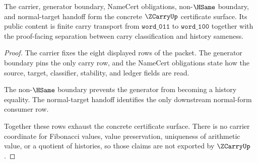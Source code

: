 \begin{theorem}
\label{thm:zeckendorfcarry-concrete-packet-surface}
The carrier, generator boundary, NameCert obligations, non-$\HSame$ boundary, and normal-target handoff form the concrete $\ZCarryUp$ certificate surface. Its public content is finite carry transport from $\mathtt{word\_011}$ to $\mathtt{word\_100}$ together with the proof-facing separation between carry classification and history sameness.
\end{theorem}
\begin{proof}
The carrier fixes the eight displayed rows of the packet. The generator boundary pins the only carry row, and the NameCert obligations state how the source, target, classifier, stability, and ledger fields are read.

The non-$\HSame$ boundary prevents the generator from becoming a history equality. The normal-target handoff identifies the only downstream normal-form consumer row.

Together these rows exhaust the concrete certificate surface. There is no carrier coordinate for Fibonacci values, value preservation, uniqueness of arithmetic value, or a quotient of histories, so those claims are not exported by $\ZCarryUp$.
\end{proof}

